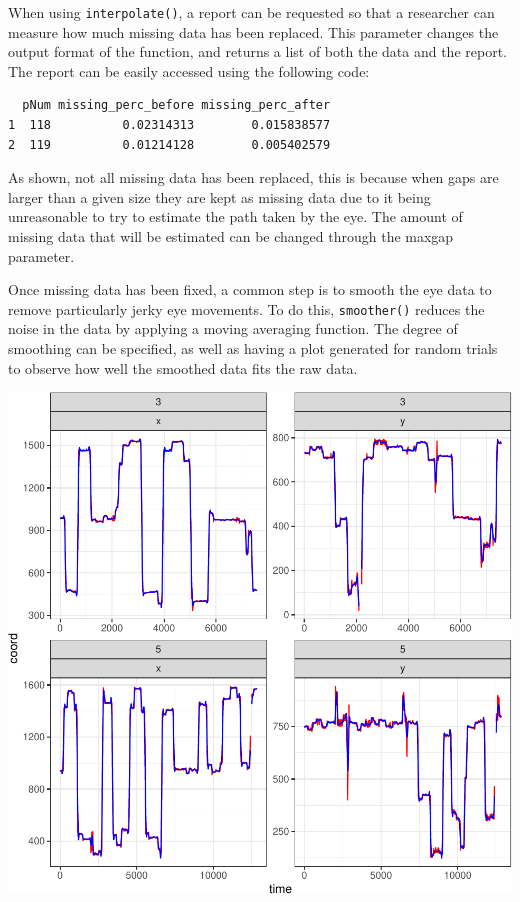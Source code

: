 \documentclass[
  man,
  floatsintext,
  longtable,
  nolmodern,
  notxfonts,
  notimes,
  colorlinks=true,linkcolor=blue,citecolor=blue,urlcolor=blue]{apa7}
\begin{document}
When using \texttt{interpolate()}, a report can be requested so that a
researcher can measure how much missing data has been replaced. This
parameter changes the output format of the function, and returns a list
of both the data and the report. The report can be easily accessed using
the following code:

\begin{verbatim}
  pNum missing_perc_before missing_perc_after
1  118          0.02314313        0.015838577
2  119          0.01214128        0.005402579
\end{verbatim}

As shown, not all missing data has been replaced, this is because when
gaps are larger than a given size they are kept as missing data due to
it being unreasonable to try to estimate the path taken by the eye. The
amount of missing data that will be estimated can be changed through the
maxgap parameter.

Once missing data has been fixed, a common step is to smooth the eye
data to remove particularly jerky eye movements. To do this,
\texttt{smoother()} reduces the noise in the data by applying a moving
averaging function. The degree of smoothing can be specified, as well as
having a plot generated for random trials to observe how well the
smoothed data fits the raw data.

\includegraphics{BRM_ms_files/figure-pdf/unnamed-chunk-6-1.pdf}
\end{document}
